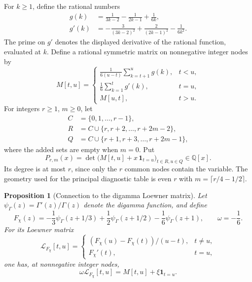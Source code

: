 \documentclass[11pt,a4paper]{article}
\newtheorem{proposition}[theorem]{Proposition}
\theoremstyle{definition}
\theoremstyle{remark}
\begin{document}
For $k\ge1$, define the rational numbers
\begin{align}
 g(k)&=\frac1{3k-2}-\frac1{2k-1}+\frac1{6k},
 \label{f-eq-g}\\
 g'(k)&=-\frac3{(3k-2)^2}+\frac2{(2k-1)^2}-\frac1{6k^2}.
 \label{f-eq-g-prime}
\end{align}
The prime on $g'$ denotes the displayed derivative of the rational
function, evaluated at $k$.  Define a rational symmetric matrix on
nonnegative integer nodes by
\begin{equation}
 M[t,u]=
 \begin{cases}
 \displaystyle\frac1{6(u-t)}\sum_{k=t+1}^{u}g(k),&t<u,\\[6pt]
 \displaystyle\frac16\sum_{k=1}^{t}g'(k),&t=u,\\[6pt]
 M[u,t],&t>u.
 \end{cases}
 \label{f-eq-rational-matrix}
\end{equation}
For integers $r\ge1$, $m\ge0$, let
\begin{align*}
 C&=\{0,1,\ldots,r-1\},\\
 R&=C\cup\{r,r+2,\ldots,r+2m-2\},\\
 Q&=C\cup\{r+1,r+3,\ldots,r+2m-1\},
\end{align*}
where the added sets are empty when $m=0$.  Put
\begin{equation}
 P_{r,m}(x)=\det\bigl(M[t,u]+x\,\mathbf1_{t=u}\bigr)_{t\in R,u\in Q}
 \in\mathbb Q[x].
 \label{f-eq-determinant-polynomial}
\end{equation}
Its degree is at most $r$, since only the $r$ common nodes contain the
variable.  The geometry used for the principal diagnostic table is even
$r$ with $m=\lceil r/4-1/2\rceil$.

\begin{proposition}[Connection to the digamma Loewner matrix]
\label{f-prop-digamma-matrix}
Let $\psi_\Gamma(z)=\Gamma'(z)/\Gamma(z)$ denote the digamma function,
and define
\[
 F_\chi(z)=-\frac13\psi_\Gamma(z+1/3)
 +\frac12\psi_\Gamma(z+1/2)-\frac16\psi_\Gamma(z+1),
 \qquad \omega=-\frac16.
\]
For its Loewner matrix
\[
 \mathcal L_{F_\chi}[t,u]=
 \begin{cases}
 (F_\chi(u)-F_\chi(t))/(u-t),&t\ne u,\\
 F_\chi'(t),&t=u,
 \end{cases}
\]
one has, at nonnegative integer nodes,
\begin{equation}
 \omega\mathcal L_{F_\chi}[t,u]=M[t,u]+\xi\mathbf1_{t=u}.
 \label{f-eq-loewner-identity}
\end{equation}
\end{proposition}
\end{document}
